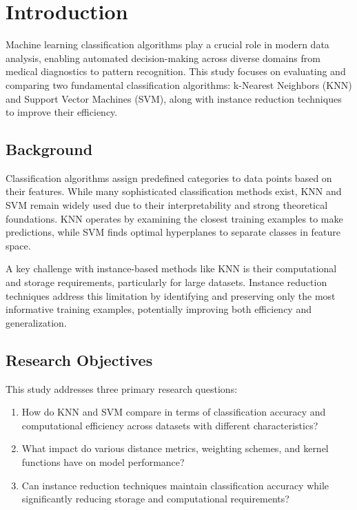 \section{Introduction}
\label{sec:introduction}

Machine learning classification algorithms play a crucial role in modern data analysis, enabling automated decision-making across diverse domains from medical diagnostics to pattern recognition. This study focuses on evaluating and comparing two fundamental classification algorithms: k-Nearest Neighbors (KNN) and Support Vector Machines (SVM), along with instance reduction techniques to improve their efficiency.

\subsection{Background}

Classification algorithms assign predefined categories to data points based on their features. While many sophisticated classification methods exist, KNN and SVM remain widely used due to their interpretability and strong theoretical foundations. KNN operates by examining the closest training examples to make predictions, while SVM finds optimal hyperplanes to separate classes in feature space.

A key challenge with instance-based methods like KNN is their computational and storage requirements, particularly for large datasets. Instance reduction techniques address this limitation by identifying and preserving only the most informative training examples, potentially improving both efficiency and generalization.

\subsection{Research Objectives}

This study addresses three primary research questions:

\begin{enumerate}
    \item How do KNN and SVM compare in terms of classification accuracy and computational efficiency across datasets with different characteristics?
    \item What impact do various distance metrics, weighting schemes, and kernel functions have on model performance?
    \item Can instance reduction techniques maintain classification accuracy while significantly reducing storage and computational requirements?
\end{enumerate}

